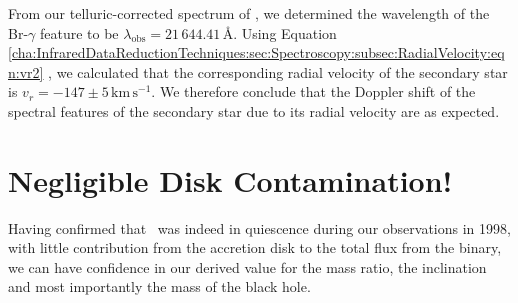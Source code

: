 \vspace{\myparskip}

From our telluric-corrected spectrum of \groj, we determined the
wavelength of the Br-$\gamma$ feature to be
$\lambda_{\mathrm{obs}}=21\,644.41$\,\AA. Using Equation~%
\vref{cha:InfraredDataReductionTechniques:sec:Spectroscopy:subsec:RadialVelocity:eqn:vr2}%
, we calculated that the corresponding radial velocity of the
secondary star is $v_r = -147\pm5\,\mathrm{km}\,\mathrm{s}^{-1}$. We
therefore conclude that the Doppler shift of the spectral features of
the secondary star due to its radial velocity are as expected. %


\section{Negligible Disk Contamination!}
\label{cha:AccretionDiskContamination:sec:NegligibleDiskContamination}

Having confirmed that \groj\ was indeed in quiescence during our observations in 1998, with little contribution from the accretion disk to the total flux from the binary, we can have confidence in our derived value for the mass ratio, the inclination and most importantly the mass of the black hole. %

